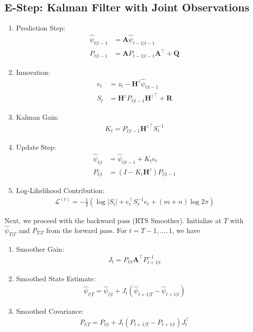 \documentclass[11pt]{article}
\theoremstyle{plain}
\theoremstyle{definition}
\theoremstyle{remark}
\numberwithin{equation}{section}
\begin{document}
\subsection{E-Step: Kalman Filter with Joint Observations}
\begin{enumerate}
    \item {Prediction Step:}
    \begin{align*}
    \hat{\psi}_{t|t-1} &= \mathbf{A} \hat{\psi}_{t-1|t-1}\\
    P_{t|t-1} &= \mathbf{A} P_{t-1|t-1} \mathbf{A}^\top + \mathbf{Q}
    \end{align*}
    
    \item Innovation:
    \begin{align*}
    e_t &= z_t - \mathbf{H}^z \hat{\psi}_{t|t-1}\\
    S_t &= \mathbf{H}^z P_{t|t-1} {\mathbf{H}^z}^\top + \mathbf{R}
    \end{align*}
    
    \item {Kalman Gain:}
    \begin{align*}
    K_t = P_{t|t-1} {\mathbf{H}^z}^\top S_t^{-1}
    \end{align*}
    
    \item {Update Step:}
    \begin{align*}
    \hat{\psi}_{t|t} &= \hat{\psi}_{t|t-1} + K_t e_t\\
    P_{t|t} &= (I - K_t \mathbf{H}^z) P_{t|t-1}
    \end{align*}
    
    \item {Log-Likelihood Contribution:}
    \begin{align*}
    \mathcal{L}^{(t)} = -\frac{1}{2} \left( \log |S_t| + e_t^\top S_t^{-1} e_t + (m+n) \log 2\pi \right)
    \end{align*}
\end{enumerate}

Next, we proceed with the backward pass (RTS Smoother). Initialize at $T$ with $\hat{\psi}_{T|T}$ and $P_{T|T}$ from the forward pass. For $t = T-1, \ldots, 1$, we have

\begin{enumerate}
    \item {Smoother Gain:}
    \begin{align*}
    J_t = P_{t|t} \mathbf{A}^\top P_{t+1|t}^{-1}
    \end{align*}
    
    \item {Smoothed State Estimate:}
    \begin{align*}
    \hat{\psi}_{t|T} = \hat{\psi}_{t|t} + J_t \left( \hat{\psi}_{t+1|T} - \hat{\psi}_{t+1|t} \right)
    \end{align*}
    
    \item {Smoothed Covariance:}
    \begin{align*}
    P_{t|T} = P_{t|t} + J_t (P_{t+1|T} - P_{t+1|t}) J_t^\top
    \end{align*}
\end{enumerate}
\end{document}

